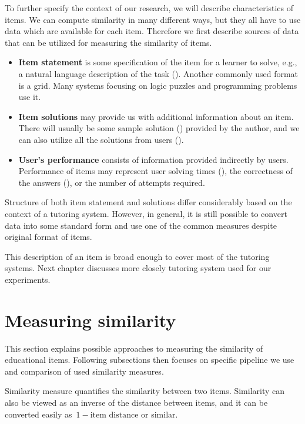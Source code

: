 \documentclass[
  print, %
  table,   %
  nolof,     %
  nolot,     %
  nocover,
  color,
  final,
]{fithesis3}
\begin{document}

To further specify the context of our research, we will describe characteristics of items. We can compute similarity in many different ways, but they all have to use data which are available for each item. Therefore we first describe sources of data that can be utilized for measuring the similarity of items.

\begin{itemize}
\item
  \textbf{Item statement} is some specification of the item for a learner to solve, e.g., a natural language description of the task (). Another commonly used format is a grid. Many systems focusing on logic puzzles and programming problems use it.
\item
  \textbf{Item solutions} may provide us with additional information about an item. There will usually be some sample solution () provided by the author, and we can also utilize all the solutions from users ().
\item
  \textbf{User's performance} consists of information provided indirectly by users. Performance of items may represent user solving times (), the correctness of the answers (), or the number of attempts required.
\end{itemize}

Structure of both item statement and solutions differ considerably based on the context of a tutoring system. However, in general, it is still possible to convert data into some standard form and use one of the common measures despite original format of items.

This description of an item is broad enough to cover most of the tutoring systems. Next chapter discusses more closely tutoring system used for our experiments.


\section{Measuring similarity}\label{measuring-similarity}

This section explains possible approaches to measuring the similarity of educational items. Following subsections then focuses on specific pipeline we use and comparison of used similarity measures.

Similarity measure quantifies the similarity between two items. Similarity can also be viewed as an inverse of the distance between items, and it can be converted easily as~$1 - \text{item distance}$ or similar.
\end{document}
